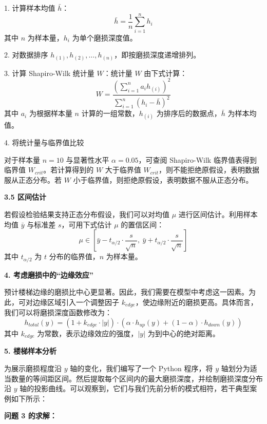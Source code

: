 \documentclass[11pt,a4paper]{ctexart}
\newcommand{\runin}[1]{\par\noindent\textbf{#1}\par\nobreak}
\begin{document}
1. 计算样本均值 $\bar{h}$：
\begin{equation}
\bar{h}=\frac{1}{n}\sum_{i=1}^{n}h_i \tag{17}
\end{equation}
其中 $n$ 为样本量，$h_i$ 为单个磨损深度值。

2. 对数据排序 $h_{(1)},h_{(2)},\dots,h_{(n)}$，即按磨损深度递增排列。

3. 计算 Shapiro-Wilk 统计量 $W$：统计量 $W$ 由下式计算：
\begin{equation}
W=\frac{\left(\sum_{i=1}^{n}a_ih_{(i)}\right)^2}{\sum_{i=1}^{n}(h_i-\bar{h})^2} \tag{18}
\end{equation}
其中 $a_i$ 为根据样本量 $n$ 计算的一组常数，$h_{(i)}$ 为排序后的数据点，$\bar{h}$ 为样本均值。

4. 将统计量与临界值比较

对于样本量 $n=10$ 与显著性水平 $\alpha=0.05$，可查阅 Shapiro-Wilk 临界值表得到临界值 $W_{crit}$。若计算得到的 $W$ 大于临界值 $W_{crit}$，则不能拒绝原假设，表明数据服从正态分布。若 $W$ 小于临界值，则拒绝原假设，表明数据不服从正态分布。

\runin{3.5 区间估计}

若假设检验结果支持正态分布假设，我们可以对均值 $\mu$ 进行区间估计。利用样本均值 $\bar{y}$ 与标准差 $s$，可用下式估计 $\mu$ 的置信区间：
\begin{equation}
\mu\in\left[\bar{y}-t_{\alpha/2}\cdot\frac{s}{\sqrt{n}},\ \bar{y}+t_{\alpha/2}\cdot\frac{s}{\sqrt{n}}\right] \tag{19}
\end{equation}
其中 $t_{\alpha/2}$ 为 $t$ 分布的临界值，$n$ 为样本量。

\runin{4. 考虑磨损中的“边缘效应”}

预计楼梯边缘的磨损比中心更显著。因此，我们需要在模型中考虑这一因素。为此，可对边缘区域引入一个调整因子 $k_{edge}$，使边缘附近的磨损更高。具体而言，我们可以将磨损深度函数修改为：
\begin{equation}
h_{total}(y)=\left(1+k_{edge}\cdot|y|\right)\cdot\left(\alpha\cdot h_{up}(y)+(1-\alpha)\cdot h_{down}(y)\right) \tag{20}
\end{equation}
其中 $k_{edge}$ 为常数，表示边缘效应的强度，$|y|$ 为到中心的绝对距离。

\runin{5. 楼梯样本分析}

为展示磨损程度沿 $y$ 轴的变化，我们编写了一个 Python 程序，将 $y$ 轴划分为适当数量的等间距区间。然后提取每个区间内的最大磨损深度，并绘制磨损深度分布沿 $y$ 轴的投影曲线。可以观察到，它们与我们先前分析的模式相符，若干典型案例如下所示：

\runin{问题 3 的求解：}
\end{document}
